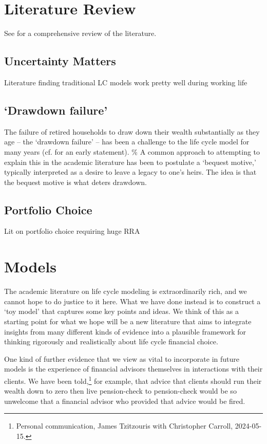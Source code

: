 \documentclass{article}
\begin{document}
\section{Literature Review}

See \cite{Dynan_2002} for a comprehensive review of the literature.

\subsection{Uncertainty Matters}

Literature finding traditional LC models work pretty well during working life

\subsection{`Drawdown failure'}

The failure of retired households to draw down their wealth substantially as they age -- the `drawdown failure' -- has been a challenge to the life cycle model for many years (cf. \cite{hurd1987savings} for an early statement).  \% A common approach to attempting to explain this in the academic literature has been to postulate a `bequest motive,' typically interpreted as a desire to leave a legacy to one's heirs. The idea is that the bequest motive is what deters drawdown.

\subsection{Portfolio Choice}

Lit on portfolio choice requiring huge RRA

\section{Models}

The academic literature on life cycle modeling is extraordinarily rich, and we cannot hope to do justice to it here. What we have done instead is to construct a `toy model' that captures some key points and ideas. We think of this as a starting point for what we hope will be a new literature that aims to integrate insights from many different kinds of evidence into a plausible framework for thinking rigorously and realistically about life cycle financial choice.

One kind of further evidence that we view as vital to incorporate in future models is the experience of financial advisors themselves in interactions with their clients. We have been told,\footnote{Personal communication, James Tzitzouris with Christopher Carroll, 2024-05-15.} for example, that advice that clients should run their wealth down to zero then live pension-check to pension-check would be so unwelcome that a financial advisor who provided that advice would be fired.
\end{document}
